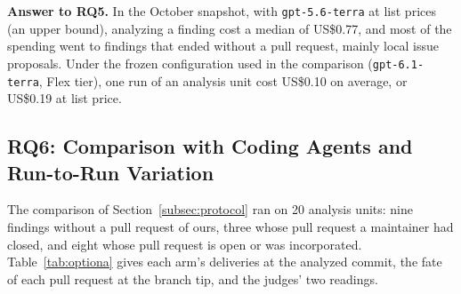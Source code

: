 \documentclass[conference]{IEEEtran}
\newcommand{\researchq}[1]{\textbf{RQ#1}}
\begin{document}
\textbf{Answer to \researchq{5}.} In the October snapshot, with
\texttt{gpt-5.6-terra} at list prices (an upper bound), analyzing a finding
cost a median of US\$0.77, and most of the spending went to findings
that ended without a pull request, mainly local issue proposals. Under the
frozen configuration used in the comparison (\texttt{gpt-6.1-terra}, Flex
tier), one run of an analysis unit cost US\$0.10 on average, or US\$0.19 at
list price.

\subsection{\researchq{6}: Comparison with Coding Agents and Run-to-Run Variation}
\label{subsec:rq6}

The comparison of Section~\ref{subsec:protocol} ran on 20 analysis units: nine
findings without a pull request of ours, three whose pull request a maintainer
had closed, and eight whose pull request is open or was incorporated.
Table~\ref{tab:optiona} gives each arm's deliveries at the analyzed commit, the
fate of each pull request at the branch tip, and the judges' two readings.
\end{document}
